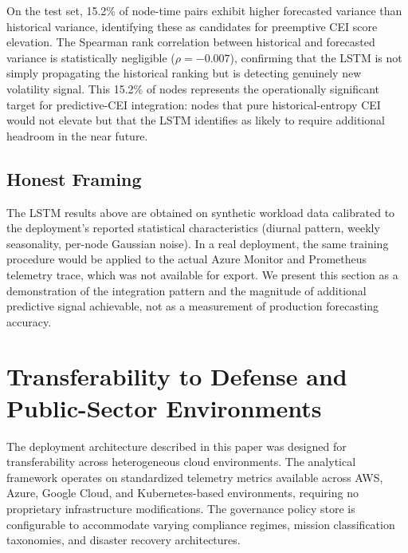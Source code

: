 \documentclass[runningheads]{llncs}
\begin{document}
On the test set, 15.2\% of node-time pairs exhibit higher forecasted variance than historical variance, identifying these as candidates for preemptive CEI score elevation. The Spearman rank correlation between historical and forecasted variance is statistically negligible ($\rho = -0.007$), confirming that the LSTM is not simply propagating the historical ranking but is detecting genuinely new volatility signal. This 15.2\% of nodes represents the operationally significant target for predictive-CEI integration: nodes that pure historical-entropy CEI would not elevate but that the LSTM identifies as likely to require additional headroom in the near future.

\subsection{Honest Framing}

The LSTM results above are obtained on synthetic workload data calibrated to the deployment's reported statistical characteristics (diurnal pattern, weekly seasonality, per-node Gaussian noise). In a real deployment, the same training procedure would be applied to the actual Azure Monitor and Prometheus telemetry trace, which was not available for export. We present this section as a demonstration of the integration pattern and the magnitude of additional predictive signal achievable, not as a measurement of production forecasting accuracy.

\section{Transferability to Defense and Public-Sector Environments}
\label{sec:transferability}

The deployment architecture described in this paper was designed for transferability across heterogeneous cloud environments. The analytical framework operates on standardized telemetry metrics available across AWS, Azure, Google Cloud, and Kubernetes-based environments, requiring no proprietary infrastructure modifications. The governance policy store is configurable to accommodate varying compliance regimes, mission classification taxonomies, and disaster recovery architectures.
\end{document}
